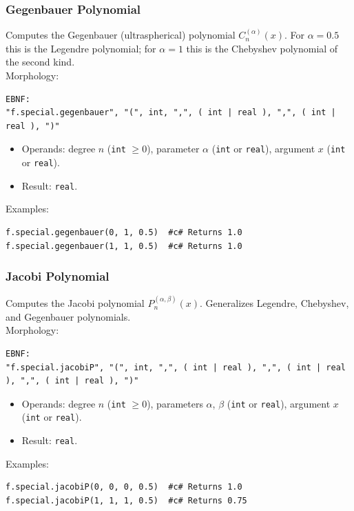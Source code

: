 \subsubsection{Gegenbauer Polynomial}
Computes the Gegenbauer (ultraspherical) polynomial $C_n^{(\alpha)}(x)$. For $\alpha = 0.5$ this is the Legendre polynomial; for $\alpha = 1$ this is the Chebyshev polynomial of the second kind. \\
Morphology:
\begin{verbatim}
EBNF:
"f.special.gegenbauer", "(", int, ",", ( int | real ), ",", ( int | real ), ")"
\end{verbatim}
\begin{itemize}
\item Operands: degree $n$ (\texttt{int} $\geq 0$), parameter $\alpha$ (\texttt{int} or \texttt{real}), argument $x$ (\texttt{int} or \texttt{real}).
\item Result: \texttt{real}.
\end{itemize}
Examples:
\begin{verbatim}
f.special.gegenbauer(0, 1, 0.5)  #c# Returns 1.0
f.special.gegenbauer(1, 1, 0.5)  #c# Returns 1.0
\end{verbatim}

\subsubsection{Jacobi Polynomial}
Computes the Jacobi polynomial $P_n^{(\alpha, \beta)}(x)$. Generalizes Legendre, Chebyshev, and Gegenbauer polynomials. \\
Morphology:
\begin{verbatim}
EBNF:
"f.special.jacobiP", "(", int, ",", ( int | real ), ",", ( int | real ), ",", ( int | real ), ")"
\end{verbatim}
\begin{itemize}
\item Operands: degree $n$ (\texttt{int} $\geq 0$), parameters $\alpha$, $\beta$ (\texttt{int} or \texttt{real}), argument $x$ (\texttt{int} or \texttt{real}).
\item Result: \texttt{real}.
\end{itemize}
Examples:
\begin{verbatim}
f.special.jacobiP(0, 0, 0, 0.5)  #c# Returns 1.0
f.special.jacobiP(1, 1, 1, 0.5)  #c# Returns 0.75
\end{verbatim}

